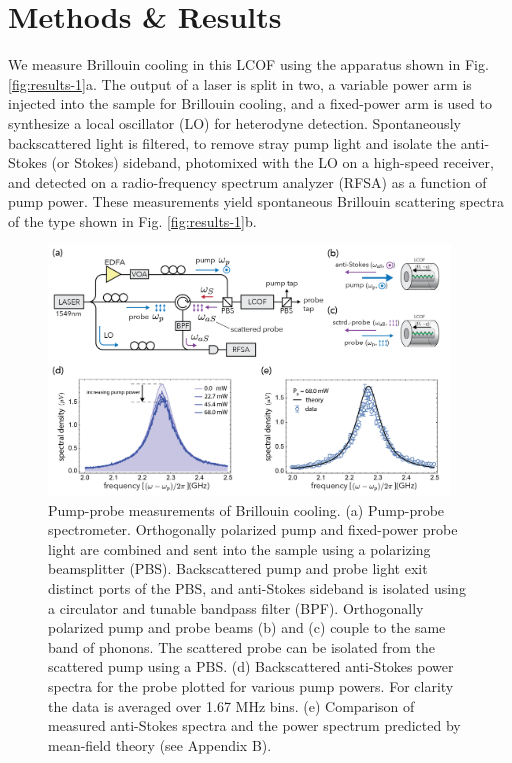 \section{Methods \& Results}
We measure Brillouin cooling in this LCOF using the apparatus shown in Fig. \ref{fig:results-1}a. The output of a laser is split in two, a variable power arm is injected into the sample for Brillouin cooling, and a fixed-power arm is used to synthesize a local oscillator (LO) for heterodyne detection. Spontaneously backscattered light is filtered, to remove stray pump light and isolate the anti-Stokes (or Stokes) sideband, photomixed with the LO on a high-speed receiver, and detected on a radio-frequency spectrum analyzer (RFSA) as a function of pump power. These measurements yield spontaneous Brillouin scattering spectra of the type shown in Fig. \ref{fig:results-1}b.

\begin{figure}[t]
    \centering \includegraphics[width=0.95\textwidth]{figs/2-Cooling/apparatus_pump_probe_v4-01.png}
    \caption{Pump-probe measurements of Brillouin cooling. (a) Pump-probe spectrometer. Orthogonally polarized pump and fixed-power probe light are combined and sent into the sample using a polarizing beamsplitter (PBS). Backscattered pump and probe light exit distinct ports of the PBS, and anti-Stokes sideband is isolated using a circulator and tunable bandpass filter (BPF). Orthogonally polarized pump and probe beams (b) and (c) couple to the same band of phonons. The scattered probe can be isolated from the scattered pump using a PBS.
    (d) Backscattered anti-Stokes power spectra for the probe plotted for various pump powers. For clarity the data is averaged over 1.67 MHz bins. (e) Comparison of measured anti-Stokes spectra and the power spectrum predicted by mean-field theory (see Appendix B).}
    \label{fig:results-2}
\end{figure}

